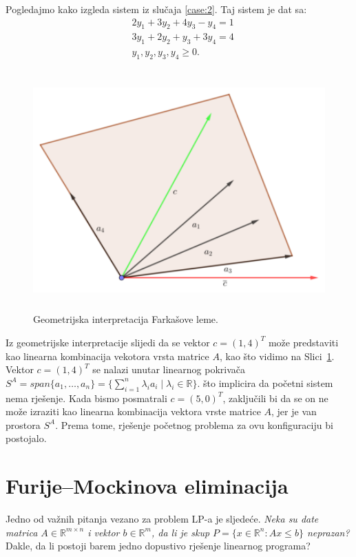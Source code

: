 \documentclass[a4paper, utf8, 11pt, colorlinks]{book}
\theoremstyle{definition}
\begin{document}
Pogledajmo kako izgleda sistem iz slučaja \ref{case:2}. Taj sistem je dat sa:
\begin{align*}
	&2 y_1 + 3 y_2 + 4 y_3 - y_4 = 1\\
	&3y_1 + 2 y_2 + y_3 + 3 y_4 = 4 \\
	& y_1, y_2, y_3, y_4 \geq 0. 
\end{align*}
\begin{figure}[!ht]
	\centering
	\includegraphics[width=350pt, height=260pt]{farkas-geometry.eps}
	\vspace{-1cm}
	\caption{Geometrijska interpretacija Farkašove leme.}
	\label{fig:farkas-slika}
\end{figure}
Iz geometrijske interpretacije slijedi da se vektor $c =(1,4)^T$ može predstaviti kao linearna kombinacija vekotora vrsta matrice $A$, kao što vidimo na Slici~\ref{fig:farkas-slika}. Vektor $c =(1,4)^T$ se nalazi unutar linearnog pokrivača $S^A = span\{a_1, \ldots, a_n \} = \{\sum_{i=1}^n \lambda_i a_i \mid \lambda_i \in \mathbb{R}\}$. što implicira da početni sistem nema rješenje. 
Kada bismo posmatrali $c=(5,0)^T$, zaključili bi da se on ne može izraziti kao linearna kombinacija vektora vrste matrice $A$, jer je van prostora  $S^A $. Prema tome, rješenje početnog problema za ovu konfiguraciju bi postojalo.  

\section{Furije–Mockinova eliminacija}
Jedno od važnih pitanja vezano za problem  LP-a je sljedeće. 
\emph{Neka su date matrica $A \in \mathbb{R}^{m \times n}$ i vektor $b \in \mathbb{R}^m$, da li je skup $P = \{x \in \mathbb{R}^n \colon A x \leq b\}$ neprazan?} Dakle, da li postoji barem jedno dopustivo rješenje linearnog programa? 	
\end{document}
